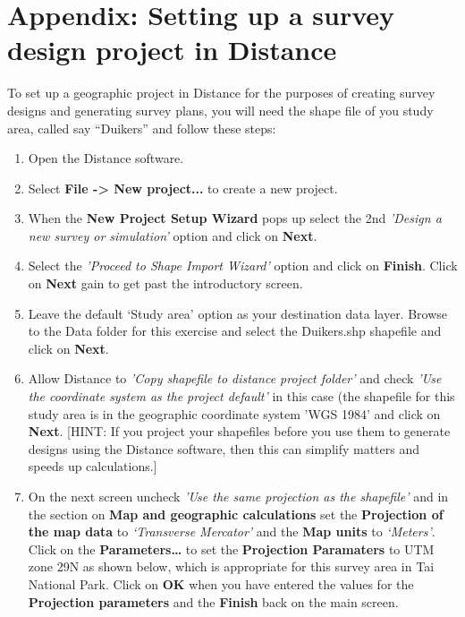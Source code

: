 \documentclass[a4paper, 10pt]{article}
\begin{document}
\printbibliography

\section{Appendix: Setting up a survey design project in Distance}

To set up a geographic project in Distance for the purposes of creating survey designs and generating survey plans, you will need the shape file of you study area, called say “Duikers” and follow these steps:

\begin{enumerate}
	\item Open the Distance software.
	\item Select \textbf{File -> New project...} to create a new project.
	\item When the \textbf{New Project Setup Wizard} pops up select the 2nd \emph{'Design a new survey or simulation'} option and click on \textbf{Next}. 
	\item Select the \emph{'Proceed to Shape Import Wizard'} option and click on \textbf{Finish}. Click on \textbf{Next} gain to get past the introductory screen.
	\item Leave the default ‘Study area’ option as your destination data layer. Browse to the Data folder for this exercise and select the Duikers.shp shapefile and click on \textbf{Next}. 
	\item Allow Distance to \emph{'Copy shapefile to distance project folder'} and check \emph{'Use the coordinate system as the project default'} in this case (the shapefile for this study area is in the geographic coordinate system 'WGS 1984' and click on \textbf{Next}. [HINT: If you project your shapefiles before you use them to generate designs using the Distance software, then this can simplify matters and speeds up calculations.]
	\item On the next screen uncheck \emph{'Use the same projection as the shapefile'} and in the section on \textbf{Map and geographic calculations} set the \textbf{Projection of the map data} to \emph{‘Transverse Mercator’} and the \textbf{Map units} to \emph{‘Meters’}. Click on the \textbf{Parameters…} to set the \textbf{Projection Paramaters} to UTM zone 29N as shown below, which is appropriate for this survey area in Tai National Park. Click on \textbf{OK} when you have entered the values for the \textbf{Projection parameters} and the \textbf{Finish} back on the main screen.


\end{enumerate}
\end{document}
